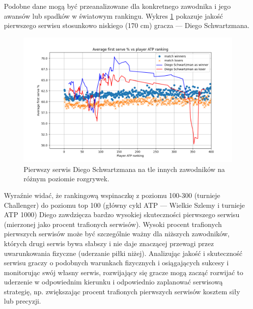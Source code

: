 \documentclass[12pt, a4paper]{article}
\begin{document}
Podobne dane mogą być przeanalizowane dla konkretnego zawodnika i jego awansów lub spadków w światowym rankingu. Wykres \ref{fig:serve_Diego} pokazuje jakość pierwszego serwisu stosunkowo niskiego (170 cm) gracza --- Diego Schwartzmana. 
\begin{figure}[h]
    \includegraphics[width=\textwidth]{figures/serve_Diego.png}
    \caption{Pierwszy serwis Diego Schwartzmana na tle innych zawodników na różnym poziomie rozgrywek.}
    \label{fig:serve_Diego}
\end{figure}
Wyraźnie widać, że rankingową wspinaczkę z poziomu 100-300 (turnieje Challenger) do poziomu top 100 (główny cykl ATP --- Wielkie Szlemy i turnieje ATP 1000) Diego zawdzięcza bardzo wysokiej skuteczności pierwszego serwisu (mierzonej jako procent trafionych serwisów). Wysoki procent trafionych pierwszych serwisów może być szczególnie ważny dla niższych zawodników, których drugi serwis bywa słabszy i nie daje znaczącej przewagi przez uwarunkowania fizyczne (uderzanie piłki niżej). Analizując jakość i skuteczność serwisu graczy o podobnych warunkach fizycznych i osiągających sukcesy i monitorując swój własny serwis, rozwijający się gracze mogą zacząć rozwijać to uderzenie w odpowiednim kierunku i odpowiednio zaplanować serwisową strategię, np. zwiększając procent trafionych pierwszych serwisów kosztem siły lub precyzji.
\end{document}
